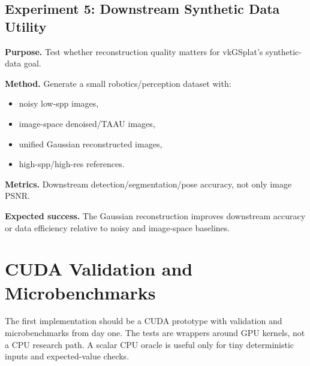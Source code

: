 \documentclass[11pt]{article}
\begin{document}
\subsection{Experiment 5: Downstream Synthetic Data Utility}

\textbf{Purpose.} Test whether reconstruction quality matters for vkGSplat's
synthetic-data goal.

\textbf{Method.} Generate a small robotics/perception dataset with:

\begin{itemize}
  \item noisy low-spp images,
  \item image-space denoised/TAAU images,
  \item unified Gaussian reconstructed images,
  \item high-spp/high-res references.
\end{itemize}

\textbf{Metrics.} Downstream detection/segmentation/pose accuracy, not only
image PSNR.

\textbf{Expected success.} The Gaussian reconstruction improves downstream
accuracy or data efficiency relative to noisy and image-space baselines.

\section{CUDA Validation and Microbenchmarks}

The first implementation should be a CUDA prototype with validation and
microbenchmarks from day one. The tests are wrappers around GPU kernels, not a
CPU research path. A scalar CPU oracle is useful only for tiny deterministic
inputs and expected-value checks.
\end{document}
